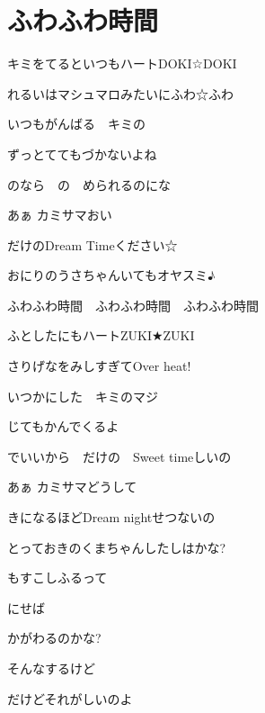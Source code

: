 \section{ふわふわ時間}

キミをてるといつもハートDOKI☆DOKI

れるいはマシュマロみたいにふわ☆ふわ

いつもがんばる　キミの

ずっとててもづかないよね

のなら　の　められるのにな

\bigskip

あぁ カミサマおい

だけのDream Timeください☆

おにりのうさちゃんいてもオヤスミ♪

\bigskip

ふわふわ時間　ふわふわ時間　ふわふわ時間

\bigskip

ふとしたにもハートZUKI★ZUKI

さりげなをみしすぎてOver heat!

いつかにした　キミのマジ

じてもかんでくるよ

でいいから　だけの　Sweet timeしいの

\bigskip

あぁ カミサマどうして

きになるほどDream nightせつないの

とっておきのくまちゃんしたしはかな?

\bigskip

もすこしふるって

にせば

かがわるのかな?

そんなするけど

\bigskip

だけどそれがしいのよ

